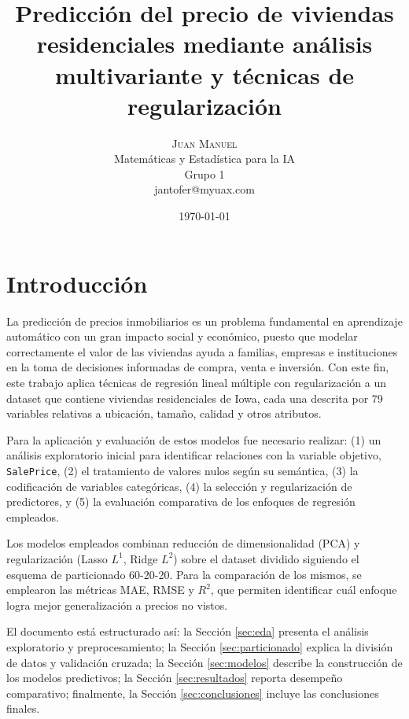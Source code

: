 \documentclass[a4paper,twocolumn]{article}
\title{Predicción del precio de viviendas residenciales mediante análisis multivariante y técnicas de regularización} %
\author{%
	\textsc{Juan Manuel} \\[1ex] %
	\normalsize Matemáticas y Estadística para la IA\\
	\normalsize Grupo 1 \\ %
	\normalsize jantofer@myuax.com %
}
\date{\today} %
\begin{document}
		\maketitle
	
	
	\section{Introducción}
	\label{sec:introduccion}

	La predicción de precios inmobiliarios es un problema fundamental en aprendizaje automático con un gran impacto social y económico, puesto que modelar correctamente el valor de las viviendas ayuda a familias, empresas e instituciones en la toma de decisiones informadas de compra, venta e inversión. Con este fin, este trabajo aplica técnicas de regresión lineal múltiple con regularización a un dataset que contiene viviendas residenciales de Iowa, cada una descrita por 79 variables relativas a ubicación, tamaño, calidad y otros atributos.

	\vspace{0.2cm}
 
	Para la aplicación y evaluación de estos modelos fue necesario realizar: (1) un análisis exploratorio inicial para identificar relaciones con la variable objetivo, \texttt{SalePrice}, (2) el tratamiento de valores nulos según su semántica, (3) la codificación de variables categóricas, (4) la selección y regularización de predictores, y (5) la evaluación comparativa de los enfoques de regresión empleados.

	\vspace{0.2cm}

	Los modelos empleados combinan reducción de dimensionalidad (PCA) y regularización (Lasso $L^1$, Ridge $L^2$) sobre el dataset dividido siguiendo el esquema de particionado 60-20-20. Para la comparación de los mismos, se emplearon las métricas MAE, RMSE y $R^2$, que permiten identificar cuál enfoque logra mejor generalización a precios no vistos.

	\vspace{0.2cm}
	
	El documento está estructurado así: la Sección \ref{sec:eda} presenta el análisis exploratorio y preprocesamiento; la Sección \ref{sec:particionado} explica la división de datos y validación cruzada; la Sección \ref{sec:modelos} describe la construcción de los modelos predictivos; la Sección \ref{sec:resultados} reporta desempeño comparativo; finalmente, la Sección \ref{sec:conclusiones} incluye las conclusiones finales.		%
\end{document}
